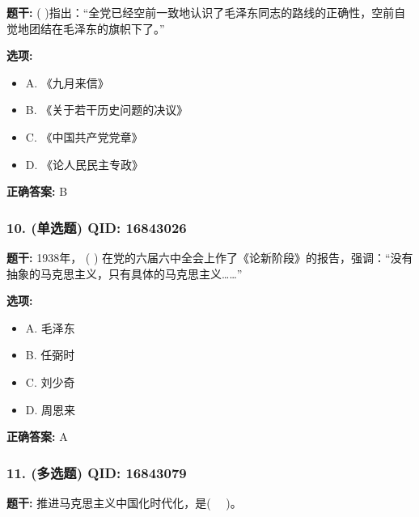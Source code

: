 \documentclass[12pt,UTF8]{ctexart}
\begin{document}
\textbf{题干:}
( )指出：“全党已经空前一致地认识了毛泽东同志的路线的正确性，空前自觉地团结在毛泽东的旗帜下了。”

\textbf{选项:}
\begin{itemize}[leftmargin=*]

  \item A. 《九月来信》

  \item B. 《关于若干历史问题的决议》

  \item C. 《中国共产党党章》

  \item D. 《论人民民主专政》

\end{itemize}

\textbf{正确答案:}
B

\vspace{0.3em}\hrulefill\vspace{0.7em}

\subsubsection*{10. (单选题) \small QID: 16843026}

\textbf{题干:}
1938年， ( ) 在党的六届六中全会上作了《论新阶段》的报告，强调：“没有抽象的马克思主义，只有具体的马克思主义……”

\textbf{选项:}
\begin{itemize}[leftmargin=*]

  \item A. 毛泽东

  \item B. 任弼时

  \item C. 刘少奇

  \item D. 周恩来

\end{itemize}

\textbf{正确答案:}
A

\vspace{0.3em}\hrulefill\vspace{0.7em}

\subsubsection*{11. (多选题) \small QID: 16843079}

\textbf{题干:}
推进马克思主义中国化时代化，是(   )。
\end{document}
